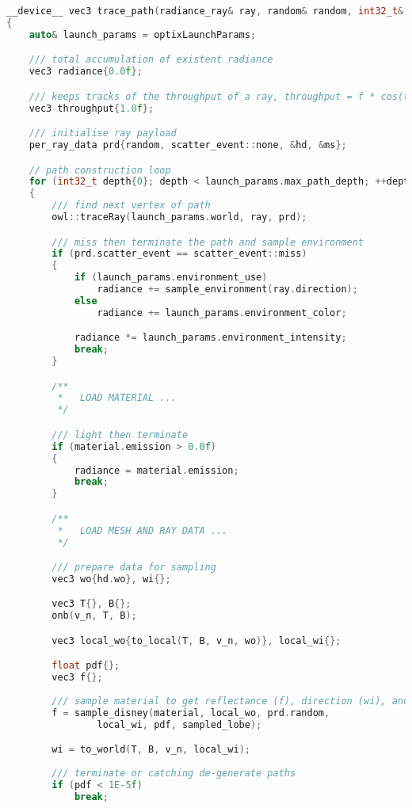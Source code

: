 \begin{lstlisting}[language=C++, caption=path construction routine, basicstyle=\tiny]
__device__ vec3 trace_path(radiance_ray& ray, random& random, int32_t& samples)
{
    auto& launch_params = optixLaunchParams;

    /// total accumulation of existent radiance
    vec3 radiance{0.0f};

    /// keeps tracks of the throughput of a ray, throughput = f * cos(theta) / pdf
    vec3 throughput{1.0f};

    /// initialise ray payload
    per_ray_data prd{random, scatter_event::none, &hd, &ms};

    // path construction loop
    for (int32_t depth{0}; depth < launch_params.max_path_depth; ++depth)
    {
        /// find next vertex of path
        owl::traceRay(launch_params.world, ray, prd);

        /// miss then terminate the path and sample environment
        if (prd.scatter_event == scatter_event::miss)
        {
            if (launch_params.environment_use)
                radiance += sample_environment(ray.direction);
            else
                radiance += launch_params.environment_color;

            radiance *= launch_params.environment_intensity;
            break;
        }

        /**
         *   LOAD MATERIAL ...
         */

        /// light then terminate
        if (material.emission > 0.0f)
        {
            radiance = material.emission;
            break;
        }

        /**
         *   LOAD MESH AND RAY DATA ...
         */

        /// prepare data for sampling
        vec3 wo{hd.wo}, wi{};

        vec3 T{}, B{};
        onb(v_n, T, B);

        vec3 local_wo{to_local(T, B, v_n, wo)}, local_wi{};

        float pdf{};
        vec3 f{};
        
        /// sample material to get reflectance (f), direction (wi), and pdf
        f = sample_disney(material, local_wo, prd.random,
                local_wi, pdf, sampled_lobe);

        wi = to_world(T, B, v_n, local_wi);
        
        /// terminate or catching de-generate paths
        if (pdf < 1E-5f)
            break;


\end{lstlisting}

